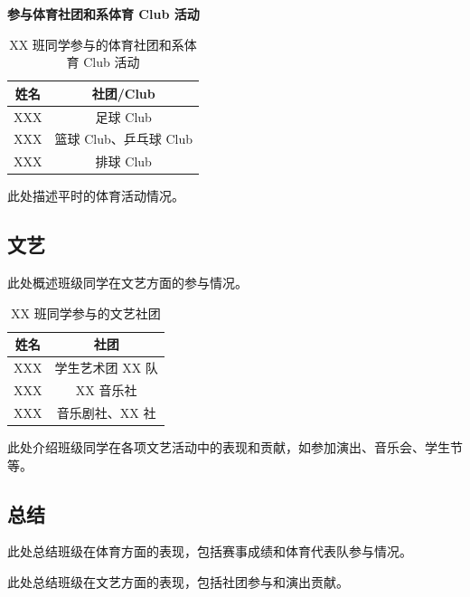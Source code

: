 \textbf{参与体育社团和系体育 Club 活动}

\begin{table}[H]
    \centering
    \begin{tabular}{||c|c||}
        \hline
        姓名   & 社团/Club                 \\
        \hline
        XXX & 足球 Club                 \\
        XXX & 篮球 Club、乒乓球 Club    \\
        XXX & 排球 Club                 \\
        \hline
    \end{tabular}
    \caption{XX 班同学参与的体育社团和系体育 Club 活动}
\end{table}

此处描述平时的体育活动情况。


\subsection{文艺}

此处概述班级同学在文艺方面的参与情况。

\begin{table}[H]
    \centering
    \begin{tabular}{||c|c||}
        \hline
        姓名   & 社团                   \\
        \hline
        XXX & 学生艺术团 XX 队       \\
        XXX & XX 音乐社              \\
        XXX & 音乐剧社、XX 社        \\
        \hline
    \end{tabular}
    \caption{XX 班同学参与的文艺社团}
\end{table}

此处介绍班级同学在各项文艺活动中的表现和贡献，如参加演出、音乐会、学生节等。



\subsection{总结}

此处总结班级在体育方面的表现，包括赛事成绩和体育代表队参与情况。

此处总结班级在文艺方面的表现，包括社团参与和演出贡献。
